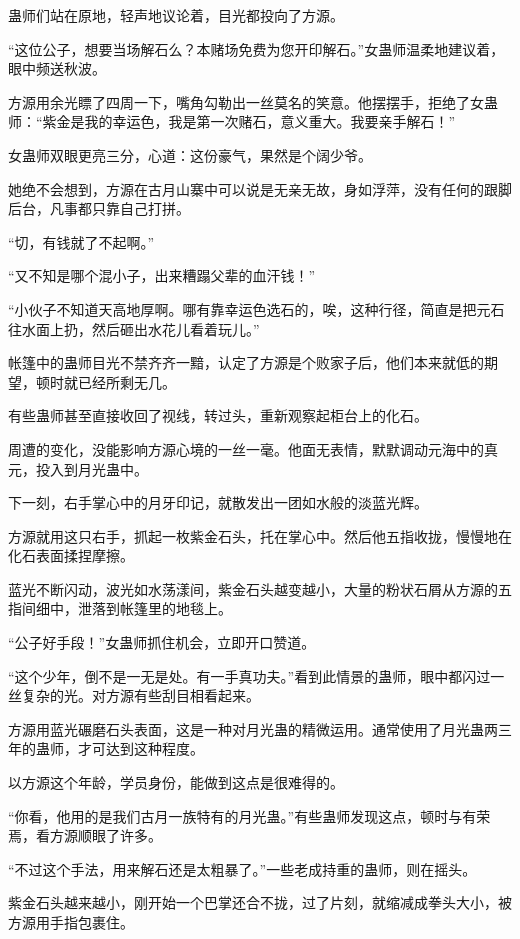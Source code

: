 \begin{this_body}
蛊师们站在原地，轻声地议论着，目光都投向了方源。

“这位公子，想要当场解石么？本赌场免费为您开印解石。”女蛊师温柔地建议着，眼中频送秋波。

方源用余光瞟了四周一下，嘴角勾勒出一丝莫名的笑意。他摆摆手，拒绝了女蛊师：“紫金是我的幸运色，我是第一次赌石，意义重大。我要亲手解石！”

女蛊师双眼更亮三分，心道：这份豪气，果然是个阔少爷。

她绝不会想到，方源在古月山寨中可以说是无亲无故，身如浮萍，没有任何的跟脚后台，凡事都只靠自己打拼。

“切，有钱就了不起啊。”

“又不知是哪个混小子，出来糟蹋父辈的血汗钱！”

“小伙子不知道天高地厚啊。哪有靠幸运色选石的，唉，这种行径，简直是把元石往水面上扔，然后砸出水花儿看着玩儿。”

帐篷中的蛊师目光不禁齐齐一黯，认定了方源是个败家子后，他们本来就低的期望，顿时就已经所剩无几。

有些蛊师甚至直接收回了视线，转过头，重新观察起柜台上的化石。

周遭的变化，没能影响方源心境的一丝一毫。他面无表情，默默调动元海中的真元，投入到月光蛊中。

下一刻，右手掌心中的月牙印记，就散发出一团如水般的淡蓝光辉。

方源就用这只右手，抓起一枚紫金石头，托在掌心中。然后他五指收拢，慢慢地在化石表面揉捏摩擦。

蓝光不断闪动，波光如水荡漾间，紫金石头越变越小，大量的粉状石屑从方源的五指间细中，泄落到帐篷里的地毯上。

“公子好手段！”女蛊师抓住机会，立即开口赞道。

“这个少年，倒不是一无是处。有一手真功夫。”看到此情景的蛊师，眼中都闪过一丝复杂的光。对方源有些刮目相看起来。

方源用蓝光碾磨石头表面，这是一种对月光蛊的精微运用。通常使用了月光蛊两三年的蛊师，才可达到这种程度。

以方源这个年龄，学员身份，能做到这点是很难得的。

“你看，他用的是我们古月一族特有的月光蛊。”有些蛊师发现这点，顿时与有荣焉，看方源顺眼了许多。

“不过这个手法，用来解石还是太粗暴了。”一些老成持重的蛊师，则在摇头。

紫金石头越来越小，刚开始一个巴掌还合不拢，过了片刻，就缩减成拳头大小，被方源用手指包裹住。


\end{this_body}
